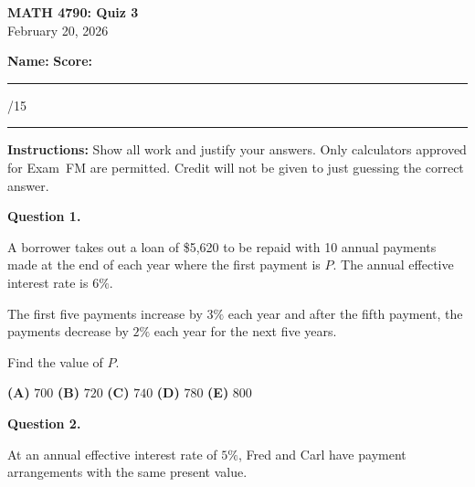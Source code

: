 \documentclass[11pt]{article}
\begin{document}
\begin{center}
    {\Large \textbf{MATH 4790: Quiz 3}}\\[0.3em]
    February 20, 2026
\end{center}

\vspace{1em}

\textbf{Name:} \hfill \textbf{Score:} \rule{1.5cm}{0.4pt}/15

\vspace{1em}

\hrule
\vspace{1em}

\textbf{Instructions:} Show all work and justify your answers. Only calculators approved for Exam~FM are permitted. Credit will not be given to just guessing the correct answer.

\vspace{1em}


\noindent\textbf{Question 1.}  



A borrower takes out a loan of \$5{,}620 to be repaid with 10 annual payments made at the end of each year where the first payment is $P$. The annual effective interest rate is $6\%$.

The first five payments increase by $3\%$ each year and after the fifth payment, the payments decrease by $2\%$ each year for the next five years.

Find the value of $P$.

\medskip

\begin{center}

\textbf{(A)} $700$
\hspace{1cm}
\textbf{(B)} $720$
\hspace{1cm}
\textbf{(C)} $740$
\hspace{1cm}
\textbf{(D)} $780$
\hspace{1cm}
\textbf{(E)} $800$

\end{center}

\newpage


\textbf{Question 2.}

At an annual effective interest rate of $5\%$, Fred and Carl have payment arrangements with the same present value.
\end{document}
